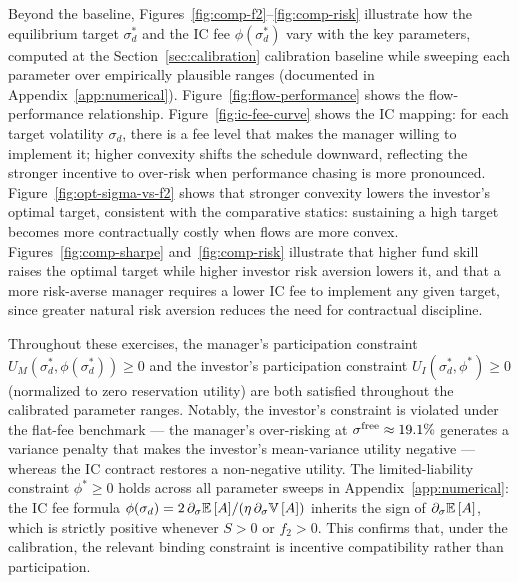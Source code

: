 Beyond the baseline, Figures~\ref{fig:comp-f2}--\ref{fig:comp-risk} illustrate how the equilibrium target $\sigma_d^*$ and the IC fee $\phi(\sigma_d^*)$ vary with the key parameters, computed at the Section~\ref{sec:calibration} calibration baseline while sweeping each parameter over empirically plausible ranges (documented in Appendix~\ref{app:numerical}). Figure~\ref{fig:flow-performance} shows the flow-performance relationship. Figure~\ref{fig:ic-fee-curve} shows the IC mapping: for each target volatility $\sigma_d$, there is a fee level that makes the manager willing to implement it; higher convexity shifts the schedule downward, reflecting the stronger incentive to over-risk when performance chasing is more pronounced. Figure~\ref{fig:opt-sigma-vs-f2} shows that stronger convexity lowers the investor's optimal target, consistent with the comparative statics: sustaining a high target becomes more contractually costly when flows are more convex. Figures~\ref{fig:comp-sharpe} and~\ref{fig:comp-risk} illustrate that higher fund skill raises the optimal target while higher investor risk aversion lowers it, and that a more risk-averse manager requires a lower IC fee to implement any given target, since greater natural risk aversion reduces the need for contractual discipline.

Throughout these exercises, the manager's participation constraint $U_M(\sigma_d^*,\phi(\sigma_d^*)) \ge 0$ and the investor's participation constraint $U_I(\sigma_d^*,\phi^*) \ge 0$ (normalized to zero reservation utility) are both satisfied throughout the calibrated parameter ranges. Notably, the investor's constraint is violated under the flat-fee benchmark --- the manager's over-risking at $\sigma^{\rm free}\approx 19.1\%$ generates a variance penalty that makes the investor's mean-variance utility negative --- whereas the IC contract restores a non-negative utility. The limited-liability constraint $\phi^* \ge 0$ holds across all parameter sweeps in Appendix~\ref{app:numerical}: the IC fee formula $\phi(\sigma_d) = 2\,\partial_\sigma {\mathbb{E}}\,[A] / (\eta\,\partial_\sigma {\mathbb{V}}\,[A])$ inherits the sign of $\partial_\sigma {\mathbb{E}}\,[A]$, which is strictly positive whenever $S > 0$ or $f_2 > 0$. This confirms that, under the calibration, the relevant binding constraint is incentive compatibility rather than participation.

